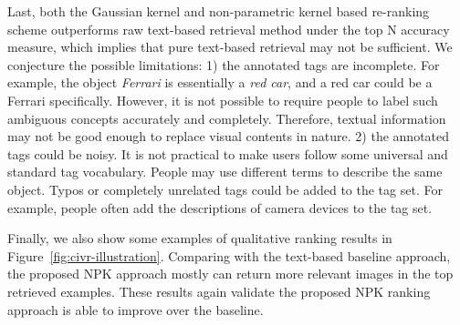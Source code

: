 Last, both the Gaussian kernel and non-parametric kernel based re-ranking
scheme outperforms raw text-based retrieval method under the top N
accuracy measure, which implies that pure text-based retrieval may not be
sufficient. We conjecture the possible limitations: 1) the annotated tags are
incomplete. For example, the object {\em Ferrari} is essentially a {\em red
car}, and a red car could be a Ferrari specifically. However, it is not
possible to require people to label such ambiguous concepts accurately
and completely. Therefore, textual information may not be good enough to
replace visual contents in nature. 2) the annotated tags could be noisy. It is
not practical to make users follow some universal and standard tag
vocabulary. People may use different terms to describe the same object.
Typos or completely unrelated tags could be added to the tag set. For
example, people often add the descriptions of camera devices to the tag
set.

Finally, we also show some examples of qualitative ranking results in Figure~\ref{fig:civr-illustration}. Comparing with the text-based baseline approach, the proposed NPK approach mostly can return more relevant images in the top retrieved examples. These results again validate the proposed NPK ranking approach is able to improve over the baseline.

